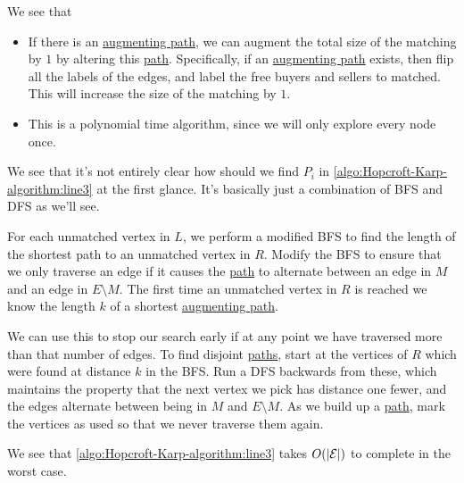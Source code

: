 \begin{intuition}
	We see that
	\begin{itemize}
		\item If there is an \hyperref[def:augmenting-path]{augmenting path}, we can augment the total size of the matching by
		      \(1\) by altering this \hyperref[def:path]{path}. Specifically, if an \hyperref[def:augmenting-path]{augmenting path}
		      exists, then flip all the labels of the edges, and label the free buyers and sellers to matched. This
		      will increase the size of the matching by \(1\).
		\item This is a polynomial time algorithm, since we will only explore every node once.
	\end{itemize}
\end{intuition}

\begin{remark}\label{rmk:lec25-1}
	We see that it's not entirely clear how should we find \(P_i\) in \autoref{algo:Hopcroft-Karp-algorithm:line3} at the first glance. It's basically just a
	combination of BFS and DFS as we'll see.
\end{remark}
\begin{explanation}
	For each unmatched vertex in \(L\), we perform a modified BFS to find the length of the shortest path to an unmatched vertex in \(R\). Modify the BFS
	to ensure that we only traverse an edge if it causes the \hyperref[def:path]{path} to alternate between an edge in \(M\) and an edge in \(E\setminus M\).
	The first time an unmatched vertex in \(R\) is reached we know the length \(k\) of a shortest \hyperref[def:augmenting-path]{augmenting path}.

	We can use this to stop our search early if at any point we have traversed more than that number of edges. To find disjoint \hyperref[def:path]{paths},
	start at the vertices of \(R\) which were found at distance \(k\) in the BFS. Run a DFS backwards from these, which maintains the property that the
	next vertex we pick has distance one fewer, and the edges alternate between being in \(M\) and \(E\setminus M\).
	As we build up a \hyperref[def:path]{path}, mark the vertices as used so that we never traverse them again.
\end{explanation}

\begin{remark}
	We see that \autoref{algo:Hopcroft-Karp-algorithm:line3} takes \(O(\left\vert \mathcal{\MakeUppercase{e}} \right\vert )\) to complete in the worst case.
\end{remark}

